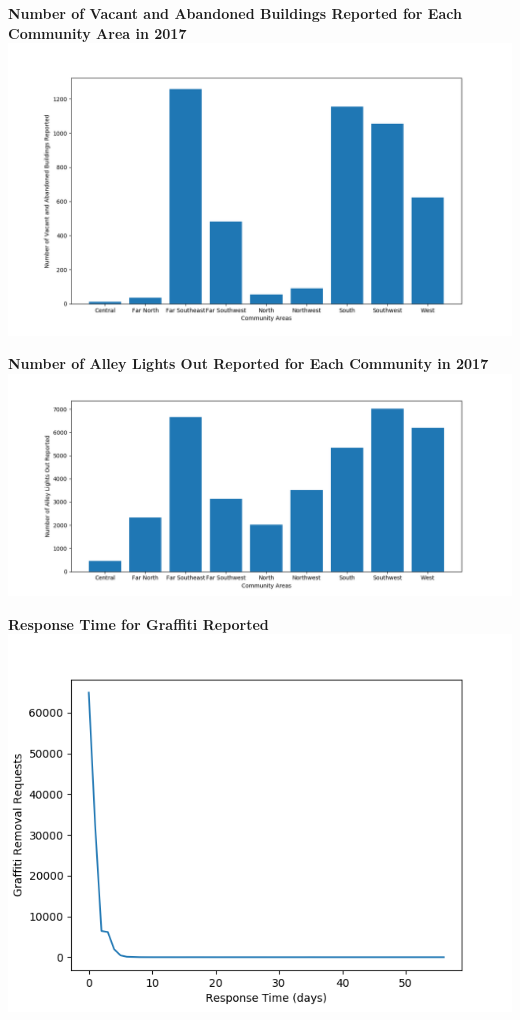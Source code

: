 \documentclass[letterpaper,12pt]{article}
\begin{document}
\noindent \textbf{Number of Vacant and Abandoned Buildings Reported for Each Community Area in 2017} \\
\includegraphics[scale=.6]{buildovercommunity.png}

\newpage

\noindent \textbf{Number of Alley Lights Out Reported for Each Community in 2017} \\
\includegraphics[scale=.6]{alleysovercommunity.png}

\noindent \textbf{Response Time for Graffiti Reported} \\
\includegraphics[scale=1]{responseovergraf.png}
\end{document}

